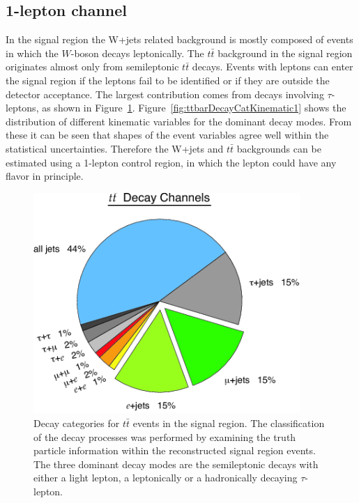 \subsection{1-lepton channel}
\par In the signal region the W+jets related background is mostly composed of events in which the $W$-boson decays leptonically. The $t\bar{t}$ background in the signal region originates almost only from semileptonic $t\bar{t}$ decays. Events with leptons can enter the signal region if the leptons fail to be identified or if they are outside the detector acceptance. The largest contribution comes from decays involving $\tau$-leptons, as shown in Figure~\ref{fig:ttbarDecayCat}. Figure~\ref{fig:ttbarDecayCatKinematic1} shows the distribution of different kinematic variables for the dominant decay modes. From these it can be seen that shapes of the event variables agree well within the statistical uncertainties. Therefore the W+jets and $t\bar{t}$ backgrounds can be estimated using a 1-lepton control region, in which the lepton could have any flavor in principle.

\begin{figure}[h]
    \centering
    \includegraphics[width=0.9\textwidth]{chapters/c7/figures/ttbar-decay-modes.png}
    \caption{Decay categories for $t\bar{t}$ events in the signal region. The classification of the decay processes was performed by examining the truth particle information within the reconstructed signal region events. The three dominant decay modes are the semileptonic decays with either a light lepton, a leptonically or a hadronically decaying $\tau$-lepton.}
    \label{fig:ttbarDecayCat}
\end{figure}

